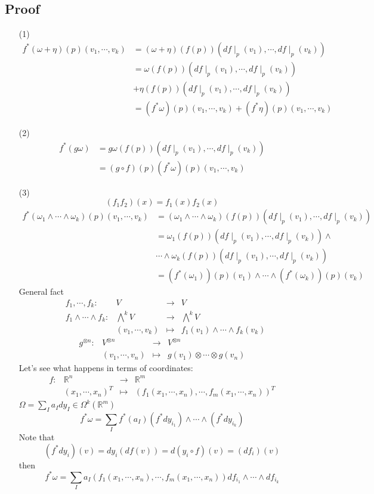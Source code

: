 \documentclass{book}
\begin{document}
\subsection*{Proof}
\begin{itemize}
    \item [(1)]
    $$\begin{aligned}
        f^*(\omega+\eta)(p)(v_1,\cdots,v_k)&=(\omega+\eta)(f(p))(df\mid_p(v_1),\cdots,df\mid_p(v_k))\\
        &=\omega(f(p))(df\mid_p(v_1),\cdots,df\mid_p(v_k))\\ &+\eta(f(p))(df\mid_p(v_1),\cdots,df\mid_p(v_k))\\
        &=(f^*\omega)(p)(v_1,\cdots,v_k)+(f^*\eta)(p)(v_1,\cdots,v_k)
    \end{aligned}$$
    \item [(2)]
    $$\begin{aligned}
        f^*(g\omega) &=g\omega(f(p))(df\mid_p(v_1),\cdots,df\mid_p(v_k))\\
        &=(g\circ f)(p)(f^*\omega)(p)(v_1,\cdots,v_k)
    \end{aligned}$$
    \item [(3)]
    $$(f_1f_2)(x)=f_1(x)f_2(x)$$
    $$\begin{aligned}
        f^*(\omega_1\wedge\cdots\wedge\omega_k)(p)(v_1,\cdots,v_k)&=(\omega_1\wedge\cdots\wedge\omega_k)(f(p))(df\mid_p(v_1),\cdots,df\mid_p(v_k))\\
        &=\omega_1(f(p))(df\mid_p(v_1),\cdots,df\mid_p(v_k))\wedge\\ &\cdots\wedge\omega_k(f(p))(df\mid_p(v_1),\cdots,df\mid_p(v_k))\\
        &=(f^*(\omega_1))(p)(v_1)\wedge\cdots\wedge(f^*(\omega_k))(p)(v_k)
    \end{aligned}$$
    General fact 
    $$\begin{aligned}
        &f_1,\cdots,f_k:&V&\rightarrow &V\\
        &f_1\wedge\cdots\wedge f_k:&\bigwedge\limits^kV&\rightarrow &\bigwedge\limits^kV\\
        &&(v_1,\cdots,v_k)&\mapsto &f_1(v_1)\wedge\cdots\wedge f_k(v_k)
    \end{aligned}$$
    $$\begin{aligned}
        g^{\otimes n}: &V^{\otimes n}&\rightarrow &V^{\otimes n}\\
        &(v_1,\cdots,v_n)&\mapsto &g(v_1)\otimes\cdots\otimes g(v_n)
    \end{aligned}$$
    Let's see what happens in terms of coordinates:
    $$\begin{aligned}
        f:&\mathbb{R}^n &\rightarrow&\mathbb{R}^m\\
        &(x_1,\cdots,x_n)^T& \mapsto &(f_1(x_1,\cdots,x_n),\cdots,f_m(x_1,\cdots,x_n))^T
    \end{aligned}$$
    $\Omega=\sum\limits_Ia_Idy_I\in \Omega^k(\mathbb{R}^m)$
    $$f^*\omega=\sum\limits_If^*(a_I)(f^*dy_{i_1})\wedge\cdots\wedge(f^*dy_{i_k})$$
    Note that $$(f^*dy_i)(v)=dy_i(df(v))=d(y_i\circ f)(v)=(df_i)(v)$$
    then 
    $$f^*\omega=\sum\limits_Ia_I(f_1(x_1,\cdots,x_n),\cdots,f_m(x_1,\cdots,x_n))df_{i_1}\wedge\cdots\wedge df_{i_k}$$
\end{itemize}
\end{document}
